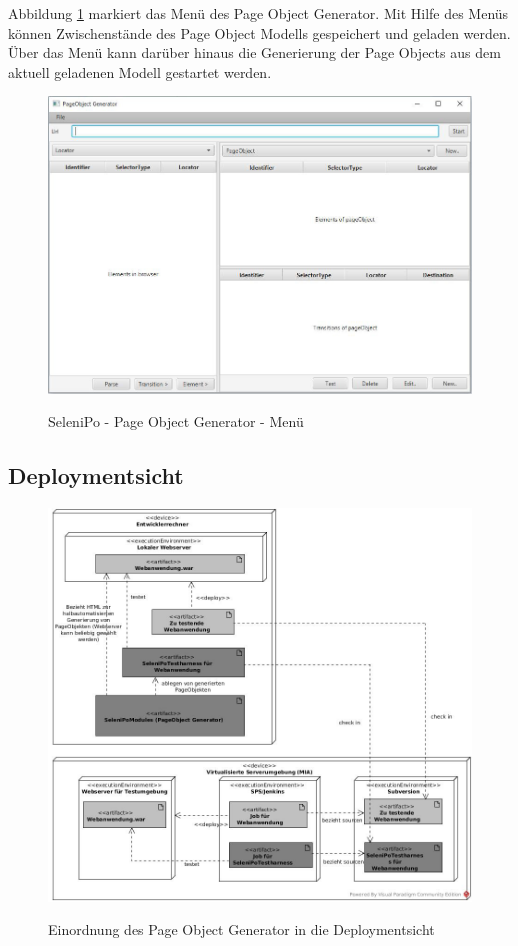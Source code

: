 \newpage

Abbildung \ref{fig:poGeneratorMenu} markiert das Menü des Page Object Generator. Mit Hilfe des Menüs können Zwischenstände des Page Object Modells gespeichert und geladen werden.
Über das Menü kann darüber hinaus die Generierung der Page Objects aus dem aktuell geladenen Modell gestartet werden.

\begin{figure}[htb]
  \centering  
  \includegraphics[scale=0.5]{img/poGeneratorMenu.JPG}\\
  \caption{SeleniPo - Page Object Generator - Menü}
  \label{fig:poGeneratorMenu}
\end{figure}

\subsection{Deploymentsicht}

\label{sec:deploymentsicht}
\begin{figure}[htb]
  \centering  
  \includegraphics[scale=0.45]{img/Deployment.jpg}\\
  \caption{Einordnung des Page Object Generator in die Deploymentsicht}
  \label{fig:deployment}
\end{figure}

